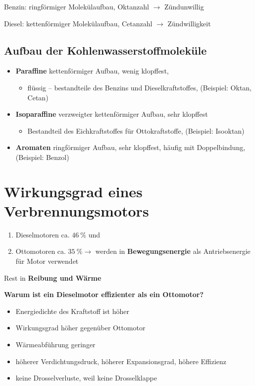 Benzin: ringförmiger Molekülaufbau, Oktanzahl $\to$ Zündunwillig

Diesel: kettenförmiger Molekülaufbau, Cetanzahl $\to$ Zündwilligkeit

\subsection{Aufbau der
Kohlenwasserstoffmoleküle}\label{aufbau-der-kohlenwasserstoffmolekuele}

\begin{itemize}
\item
  \textbf{Paraffine} kettenförmiger Aufbau, wenig klopffest,

  \begin{itemize}
  \item
    flüssig -- bestandteile des Benzins und Dieselkraftstoffes,
    (Beispiel: Oktan, Cetan)
  \end{itemize}
\item
  \textbf{Isoparaffine} verzweigter kettenförmiger Aufbau, sehr
  klopffest

  \begin{itemize}
  \item
    Bestandteil des Eichkraftstoffes für Ottokraftstoffe, (Beispiel:
    Isooktan)
  \end{itemize}
\item
  \textbf{Aromaten} ringförmiger Aufbau, sehr klopffest, häufig mit
  Doppelbindung, (Beispiel: Benzol)
\end{itemize}

\section{Wirkungsgrad eines
Verbrennungsmotors}\label{wirkungsgrad-eines-verbrennungsmotors}

\begin{enumerate}
\item
  Dieselmotoren ca. $46~\%$ und
\item
  Ottomotoren ca. $35~\% \to$ werden in \textbf{Bewegungsenergie} als
  Antriebsenergie für Motor verwendet
\end{enumerate}

Rest in \textbf{Reibung und Wärme}

\textbf{Warum ist ein Dieselmotor effizienter als ein Ottomotor?}

\begin{itemize}
\item
  Energiedichte des Kraftstoff ist höher
\item
  Wirkungsgrad höher gegenüber Ottomotor
\item
  Wärmeabführung geringer
\item
  höherer Verdichtungsdruck, höherer Expansionsgrad, höhere Effizienz
\item
  keine Drosselverluste, weil keine Drosselklappe
\end{itemize}

